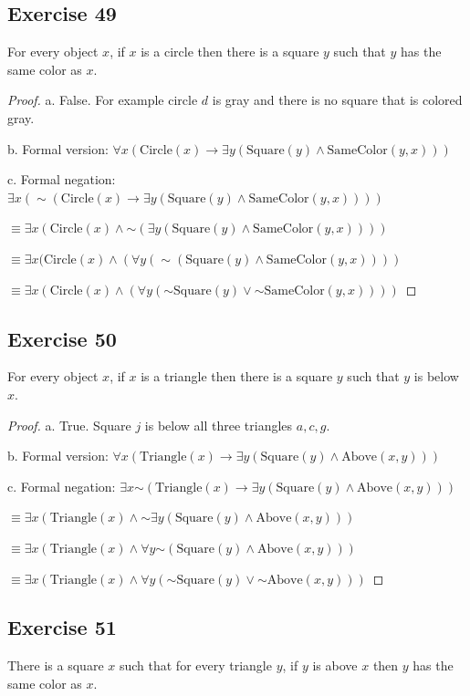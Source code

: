 \documentclass[14pt]{extarticle}
\newcommand{\fa}{\forall}
\newcommand{\te}{\exists}
\begin{document}
\subsection{Exercise 49}
For every object $x$, if $x$ is a circle then there is a square $y$ such that $y$ has the same color as $x$.

\begin{proof}
a. False. For example circle $d$ is gray and there is no
square that is colored gray.

b. Formal version: $\fa x(\text{Circle}(x) \to \te y(\text{Square}(y) \wedge \text{SameColor}(y, x)))$

c. Formal negation: $\te x({\sim (\text{Circle}(x) \to \te y(\text{Square}(y) \wedge \text{SameColor}(y, x)))})$

$\equiv \te x(\text{Circle}(x) \wedge {\sim (\te y(\text{Square}(y) \wedge \text{SameColor}(y, x)))})$

$\equiv \te x(\text{Circle}(x) \wedge (\fa y ({\sim (\text{Square}(y) \wedge \text{SameColor}(y, x))}))$

$\equiv \te x(\text{Circle}(x) \wedge (\fa y ({\sim \text{Square}(y)} \vee {\sim \text{SameColor}(y, x)})))$
\end{proof}

\subsection{Exercise 50}
For every object $x$, if $x$ is a triangle then there is a square $y$ such that $y$ is below $x$.

\begin{proof}
a. True. Square $j$ is below all three triangles $a, c, g$.

b. Formal version: $\fa x(\text{Triangle}(x) \to \te y(\text{Square}(y) \wedge \text{Above}(x, y)))$

c. Formal negation: $\te x {\sim(\text{Triangle}(x) \to \te y(\text{Square}(y) \wedge \text{Above}(x, y)))}$

$\equiv \te x (\text{Triangle}(x) \wedge {\sim\te y(\text{Square}(y) \wedge \text{Above}(x, y))})$

$\equiv \te x (\text{Triangle}(x) \wedge \fa y {\sim(\text{Square}(y) \wedge \text{Above}(x, y))})$

$\equiv \te x (\text{Triangle}(x) \wedge \fa y ({\sim\text{Square}(y)} \vee {\sim\text{Above}(x, y)}))$
\end{proof}

\subsection{Exercise 51}
There is a square $x$ such that for every triangle $y$, if $y$ is above $x$ then $y$ has the same color as $x$.
\end{document}
